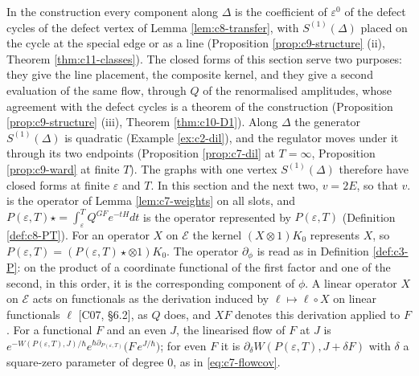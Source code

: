 In the construction every component along $\Delta$ is the coefficient of $\varepsilon^0$ of the defect cycles of the defect vertex of Lemma \ref{lem:c8-transfer}, with $S^{(1)}(\Delta)$ placed on the cycle at the special edge or as a line (Proposition \ref{prop:c9-structure} (ii), Theorem \ref{thm:c11-classes}). The closed forms of this section serve two purposes: they give the line placement, the composite kernel, and they give a second evaluation of the same flow, through $Q$ of the renormalised amplitudes, whose agreement with the defect cycles is a theorem of the construction (Proposition \ref{prop:c9-structure} (iii), Theorem \ref{thm:c10-D1}). Along $\Delta$ the generator $S^{(1)}(\Delta)$ is quadratic (Example \ref{ex:c2-dil}), and the regulator moves under it through its two endpoints (Proposition \ref{prop:c7-dil} at $T=\infty$, Proposition \ref{prop:c9-ward} at finite $T$). The graphs with one vertex $S^{(1)}(\Delta)$ therefore have closed forms at finite $\varepsilon$ and $T$. In this section and the next two, $v=2E$, so that $v.$ is the operator of Lemma \ref{lem:c7-weights} on all slots, and $P(\varepsilon,T)\star=\int_\varepsilon^TQ^{GF}e^{-tH}dt$ is the operator represented by $P(\varepsilon,T)$ (Definition \ref{def:c8-PT}). For an operator $X$ on $\mathscr E$ the kernel $(X\otimes1)K_0$ represents $X$, so $P(\varepsilon,T)=(P(\varepsilon,T)\star\otimes1)K_0$. The operator $\partial_\phi$ is read as in Definition \ref{def:c3-P}: on the product of a coordinate functional of the first factor and one of the second, in this order, it is the corresponding component of $\phi$. A linear operator $X$ on $\mathscr E$ acts on functionals as the derivation induced by $\ell\mapsto\ell\circ X$ on linear functionals $\ell$ [C07, §6.2], as $Q$ does, and $XF$ denotes this derivation applied to $F$. For a functional $F$ and an even $J$, the linearised flow of $F$ at $J$ is $e^{-W(P(\varepsilon,T),J)/\hbar}e^{\hbar\partial_{P(\varepsilon,T)}}\big(F\,e^{J/\hbar}\big)$; for even $F$ it is $\partial_\delta W(P(\varepsilon,T),J+\delta F)$ with $\delta$ a square-zero parameter of degree $0$, as in \eqref{eq:c7-flowcov}.
